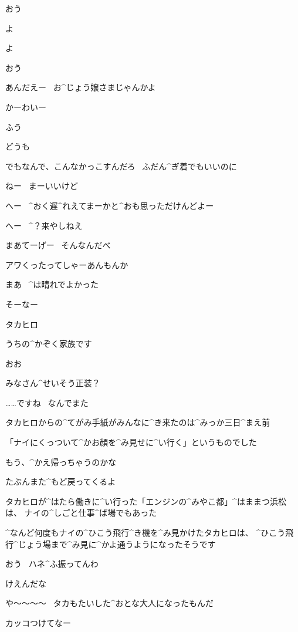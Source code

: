 \page[47]
\Ojisan おう

\Makki よ

\Alpha よ

\page[48]
\Ojisan おう

\Ojisan あんだえー
\ お^{じょう}{嬢}さまじゃんかよ

\Alpha かーわいー

\Makki ふう

\Makki どうも

\Makki でもなんで、こんなかっこすんだろ
\ ふだん^{ぎ}{着}でもいいのに

\Alpha ねー
\ まーいいけど

\page[49]
\Ojisan へー
\ ^{おく}{遅}^{れ}{え}てまーかと^{おも}{思}っただけんどよー

\Ojisan へー
\ ^{？}{来}やしねえ

\Person まあてーげー
\ そんなんだべ

\Person  アワくったってしゃーあんもんか

\Person まあ
\ ^{は}{晴}れでよかった

\Person そーなー

\page[53]
\Makki タカヒロ

\Takahiro うちの^{かぞく}{家族}です

\Nai おお

\Nai みなさん^{せいそう}{正装}？

\Takahiro ……ですね
\ なんでまた

\page[54]
\Alpha タカヒロからの^{てがみ}{手紙}がみんなに^{き}{来}たのは^{みっか}{三日}^{まえ}{前}

\Alpha 「ナイにくっついて^{かお}{顔}を^{み}{見}せに^{い}{行}く」というものでした

\Makki もう、^{かえ}{帰}っちゃうのかな

\Alpha たぶんまた^{もど}{戻}ってくるよ

\Alpha タカヒロが^{はたら}{働}きに^{い}{行}った「エンジンの^{みやこ}{都}」^{はままつ}{浜松}は、
ナイの^{しごと}{仕事}^{ば}{場}でもあった

\Alpha ^{なんど}{何度}もナイの^{ひこう}{飛行}^{き}{機}を^{み}{見}かけたタカヒロは、
^{ひこう}{飛行}^{じょう}{場}まで^{み}{見}に^{かよ}{通}うようになったそうです

\page[56]
\Ojisan おう
\ ハネ^{ふ}{振}ってんわ

\Person けえんだな

\page[57]
\Person や〜〜〜〜
\ タカもたいした^{おとな}{大人}になったもんだ

\Ojisan カッコつけてなー

